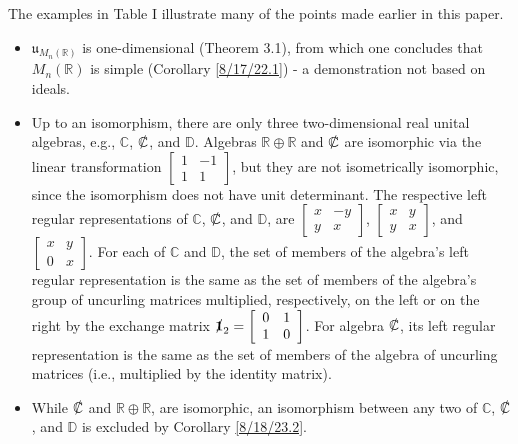 \documentclass{amsart}
\numberwithin{equation}{section}
\theoremstyle{definition}
\numberwithin{theorem}{section}
\begin{document}
The examples in Table I illustrate many of the points made earlier in this paper.    
 
\begin{itemize}\item $\mathfrak{u}_{M_n(\mathbb{R})}$ is one-dimensional (Theorem 3.1), from which one concludes that $M_n(\mathbb{R})$ is simple (Corollary \ref{8/17/22.1}) - a demonstration not based on ideals.
\item Up to an isomorphism, there are only three two-dimensional real unital algebras, e.g., $\mathbb{C}$, $\slashed{\mathbb{C}}$, and $\mathbb{D}$.  Algebras $\mathbb{R}\oplus\mathbb{R}$ and $\slashed{\mathbb{C}}$ are isomorphic via the linear transformation $\left[\begin{array}{ccc}
 1 & -1   \\ 
 1 & 1    
\end{array}\right]$, but they are not isometrically isomorphic, since the isomorphism does not have unit determinant.  The respective left regular representations of $\mathbb{C}$, $\slashed{\mathbb{C}}$, and $\mathbb{D}$, are $\left[\begin{array}{ccc}
 x & -y   \\ 
 y & x    
\end{array}\right]$, $\left[\begin{array}{ccc}
 x & y   \\ 
 y & x    
\end{array}\right]$, and $\left[\begin{array}{ccc}
 x & y   \\ 
 0 & x    
\end{array}\right]$.  For each of $\mathbb{C}$ and $\mathbb{D}$, the set of members of the algebra's left regular representation is the same as the set of members of the algebra's group of uncurling matrices multiplied, respectively, on the left or on the right by the exchange matrix $\slashed{\mathbf{1}}_2 = \left[\begin{array}{ccc}
 0 & 1   \\ 
 1 & 0    
\end{array}\right]$. For algebra $\slashed{\mathbb{C}}$, its left regular representation is the same as the set of members of the algebra of uncurling matrices (i.e., multiplied by the identity matrix).
\item While $\slashed{\mathbb{C}}$ and $\mathbb{R}\oplus\mathbb{R}$, are isomorphic, an isomorphism between any two of $\mathbb{C}$, $\slashed{\mathbb{C}}$, and $\mathbb{D}$ is excluded by Corollary \ref{8/18/23.2}.  

\end{itemize}
\end{document}
